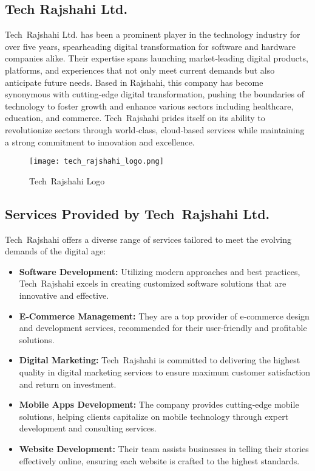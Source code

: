 \documentclass[12pt,a4paper]{article}
\begin{document}
\subsection{Tech Rajshahi Ltd.}
Tech Rajshahi Ltd. has been a prominent player in the technology industry for over five years, spearheading digital transformation for software and hardware companies alike.  Their expertise spans launching market‑leading digital products, platforms, and experiences that not only meet current demands but also anticipate future needs.  Based in Rajshahi, this company has become synonymous with cutting‑edge digital transformation, pushing the boundaries of technology to foster growth and enhance various sectors including healthcare, education, and commerce.  Tech Rajshahi prides itself on its ability to revolutionize sectors through world‑class, cloud‑based services while maintaining a strong commitment to innovation and excellence.

\begin{figure}[H]
    \centering
    \texttt{[image: tech\_rajshahi\_logo.png]}
    \caption{Tech Rajshahi Logo}
    \label{fig:tech_rajshahi_logo}
\end{figure}


\subsection{Services Provided by Tech Rajshahi Ltd.}
Tech Rajshahi offers a diverse range of services tailored to meet the evolving demands of the digital age:
\begin{itemize}
    \item \textbf{Software Development:} Utilizing modern approaches and best practices, Tech Rajshahi excels in creating customized software solutions that are innovative and effective.
    \item \textbf{E‑Commerce Management:} They are a top provider of e‑commerce design and development services, recommended for their user‑friendly and profitable solutions.
    \item \textbf{Digital Marketing:} Tech Rajshahi is committed to delivering the highest quality in digital marketing services to ensure maximum customer satisfaction and return on investment.
    \item \textbf{Mobile Apps Development:} The company provides cutting‑edge mobile solutions, helping clients capitalize on mobile technology through expert development and consulting services.
    \item \textbf{Website Development:} Their team assists businesses in telling their stories effectively online, ensuring each website is crafted to the highest standards.
\end{itemize}
\end{document}
